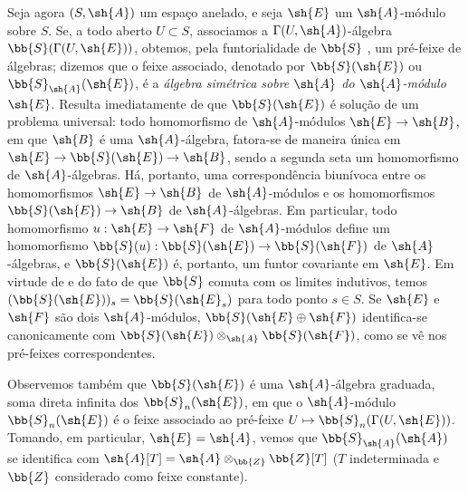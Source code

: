 \documentclass[oneside,10pt]{amsart}
\makeatletter
\newcommand{\ega@arrow}[2]{\mathchoice{#1}{#2}{#2}{#2}}
\let\ega@shortmapsto\mapsto
\renewcommand{\to}{\ega@arrow{\longrightarrow}{\rightarrow}}
\renewcommand{\mapsto}{\ega@arrow{\longmapsto}{\ega@shortmapsto}}
\newcommand{\oldpage}[2][]{\marginnote{\normalfont\footnotesize\textbf{#1}~|~#2}\ignorespaces}
\let\EGAOriginalLabel\label
\renewcommand{\label}[1]{\phantomsection\EGAOriginalLabel{#1}}
\makeatother
\begin{document}
\begin{env}[1.7.4]
\label{II.1.7.4}
Seja agora $(S,\sh{A})$ um espaço anelado, e seja $\sh{E}$ um $\sh{A}$-módulo sobre $S$.
Se, a todo aberto $U\subset S$, associamos a $\Gamma(U,\sh{A})$-álgebra $\bb{S}(\Gamma(U,\sh{E}))$, obtemos, pela funtorialidade de $\bb{S}$ , um pré-feixe de álgebras; dizemos que o feixe associado, denotado por $\bb{S}(\sh{E})$ ou $\bb{S}_\sh{A}(\sh{E})$, é a \emph{álgebra simétrica sobre $\sh{A}$ do $\sh{A}$-módulo $\sh{E}$}.
Resulta imediatamente de  que $\bb{S}(\sh{E})$ é solução de um problema universal: todo homomorfismo de $\sh{A}$-módulos $\sh{E}\to\sh{B}$, em que $\sh{B}$ é uma $\sh{A}$-álgebra, fatora-se de maneira única em $\sh{E}\to\bb{S}(\sh{E})\to\sh{B}$, sendo a segunda seta um homomorfismo de $\sh{A}$-álgebras.
Há, portanto, uma correspondência biunívoca entre os homomorfismos $\sh{E}\to\sh{B}$ de $\sh{A}$-módulos e os homomorfismos $\bb{S}(\sh{E})\to\sh{B}$ de $\sh{A}$-álgebras.
Em particular, todo homomorfismo $u:\sh{E}\to\sh{F}$ de $\sh{A}$-módulos define um homomorfismo $\bb{S}(u):\bb{S}(\sh{E})\to\bb{S}(\sh{F})$ de $\sh{A}$-álgebras, e $\bb{S}(\sh{E})$ é, portanto, um funtor covariante em $\sh{E}$.
\oldpage[II]{16}
Em virtude de  e do fato de que $\bb{S}$ comuta com os limites indutivos, temos $(\bb{S}(\sh{E}))_s=\bb{S}(\sh{E}_s)$ para todo ponto $s\in S$.
Se $\sh{E}$ e $\sh{F}$ são dois $\sh{A}$-módulos, $\bb{S}(\sh{E}\oplus\sh{F})$ identifica-se canonicamente com $\bb{S}(\sh{E})\otimes_\sh{A}\bb{S}(\sh{F})$, como se vê nos pré-feixes correspondentes.

Observemos também que $\bb{S}(\sh{E})$ é uma $\sh{A}$-álgebra graduada, soma direta infinita dos $\bb{S}_n(\sh{E})$, em que o $\sh{A}$-módulo $\bb{S}_n(\sh{E})$ é o feixe associado ao pré-feixe $U\mapsto\bb{S}_n(\Gamma(U,\sh{E}))$.
Tomando, em particular, $\sh{E}=\sh{A}$, vemos que $\bb{S}_\sh{A}(\sh{A})$ se identifica com $\sh{A}[T]=\sh{A}\otimes_\bb{Z}\bb{Z}[T]$ ($T$ indeterminada e $\bb{Z}$ considerado como feixe constante).
\end{env}
\end{document}
